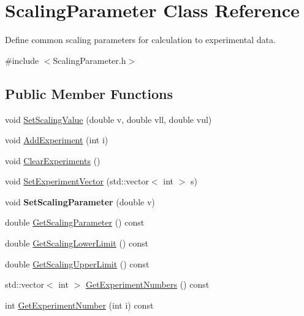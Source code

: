\hypertarget{classScalingParameter}{\section{Scaling\-Parameter Class Reference}
\label{classScalingParameter}
}


Define common scaling parameters for calculation to experimental data.  




{\ttfamily \#include $<$Scaling\-Parameter.\-h$>$}

\subsection*{Public Member Functions}
\begin{DoxyCompactItemize}
\item 
void \hyperlink{classScalingParameter_a145bb832eed013418dcc2d1206e716c2}{Set\-Scaling\-Value} (double v, double vll, double vul)
\item 
void \hyperlink{classScalingParameter_a0df5af5ed8792882f967e63809e00a25}{Add\-Experiment} (int i)
\item 
void \hyperlink{classScalingParameter_aab921d6b200c9710ce094528c1f031a1}{Clear\-Experiments} ()
\item 
void \hyperlink{classScalingParameter_a4955775390f2d1c2b702f93ff5dd7386}{Set\-Experiment\-Vector} (std\-::vector$<$ int $>$ s)
\item 
\hypertarget{classScalingParameter_a75825108052fd20db61dc0d79d232e37}{void {\bfseries Set\-Scaling\-Parameter} (double v)}\label{classScalingParameter_a75825108052fd20db61dc0d79d232e37}

\item 
double \hyperlink{classScalingParameter_a1b12c556f85254c57d3c245f787d85cf}{Get\-Scaling\-Parameter} () const 
\item 
double \hyperlink{classScalingParameter_ae6b4e7b3e43533ad4c602179f8dcaa5c}{Get\-Scaling\-Lower\-Limit} () const 
\item 
double \hyperlink{classScalingParameter_a8f08c1bb7dbbc652bb6068c06967a31c}{Get\-Scaling\-Upper\-Limit} () const 
\item 
std\-::vector$<$ int $>$ \hyperlink{classScalingParameter_a2c16f259c2b67a1ebd234f59dc4a8f8d}{Get\-Experiment\-Numbers} () const 
\item 
int \hyperlink{classScalingParameter_a0f160ce9db963a1cb57efd722d430030}{Get\-Experiment\-Number} (int i) const 
\end{DoxyCompactItemize}


